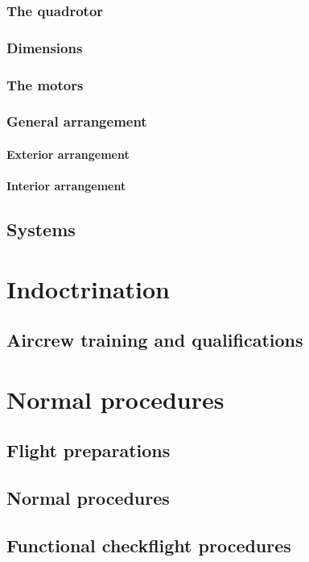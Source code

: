\documentclass{book}
\begin{document}
\section{The quadrotor}
\section{Dimensions}
\section{The motors}
\section{General arrangement}
\subsection{Exterior arrangement}
\subsection{Interior arrangement}


\chapter{Systems}

\part{Indoctrination}
\chapter{Aircrew training and qualifications}

\part{Normal procedures}
\chapter{Flight preparations}
\chapter{Normal procedures}
\chapter{Functional checkflight procedures}
\end{document}
